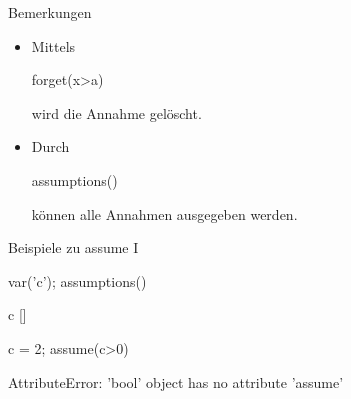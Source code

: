 \documentclass[notes=hide,hyperref={dvipdfmx,pdfpagelabels=false}]{beamer}
\begin{document}
% 
% 
% 
% 
% 





\begin{frame}[fragile]{Bemerkungen}
\begin{itemize}
\item Mittels 
\begin{sagein}
forget(x>a)
\end{sagein}
wird die Annahme  gelöscht.
\item Durch 
\begin{sagein}
assumptions() 
\end{sagein}
können alle Annahmen ausgegeben werden.
\end{itemize}
\end{frame}

\begin{frame}[fragile]{Beispiele zu assume I}
\begin{sagein}
var('c'); assumptions()
\end{sagein}
\begin{sage}
c
[]
\end{sage}

\begin{sagein}
c = 2; assume(c>0)
\end{sagein}
\begin{sage}
 AttributeError: 'bool' object has no attribute 'assume'
\end{sage}
\end{frame}
\end{document}
